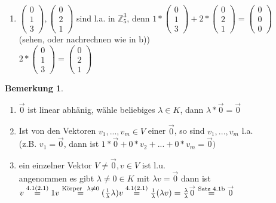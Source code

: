 \documentclass[a4paper,11pt]{article}
\newtheorem{bem}[definition]{Bemerkung}
\begin{document}
\begin{enumerate}[label=\alph*)]
\item $\begin{pmatrix}0\\1\\3\end{pmatrix},\begin{pmatrix}0\\2\\1\end{pmatrix}$ sind l.a. in $\mathbb{Z}^3_5$, denn $1*\begin{pmatrix}0\\1\\3\end{pmatrix}+2*\begin{pmatrix}0\\2\\1\end{pmatrix}=\begin{pmatrix}0\\0\\0\end{pmatrix}$ \\
(sehen, oder nachrechnen wie in b)) \\
$2*\begin{pmatrix}0\\1\\3\end{pmatrix}=\begin{pmatrix}0\\2\\1\end{pmatrix}$
\end{enumerate}
\begin{bem}
\end{bem}
\begin{enumerate}[label=\alph*)]
\item $\overset{\rightarrow}{0}$ ist linear abhänig, wähle beliebiges $\lambda\in K$, dann $\lambda*\overset{\rightarrow}{0}=\overset{\rightarrow}{0}$
\item Ist von den Vektoren $v_1,...,v_m\in V$ einer $\overset{\rightarrow}{0}$, so sind $v_1,...,v_m$ l.a. \\
(z.B. $v_1=\overset{\rightarrow}{0}$, dann ist $1*\overset{\rightarrow}{0}+0*v_2+...+0*v_m=\overset{\rightarrow}{0})$
\item ein einzelner Vektor $V\neq\overset{\rightarrow}{0},v\in V$ ist l.u. \\
angenommen es gibt $\lambda\neq0\in K$ mit $\lambda v=\overset{\rightarrow}{0}$ dann ist \\
$v\overset{4.1(2.1)}{=}1v\overset{\text{Körper}\hspace{2mm}\lambda\neq0}{=}(\frac{1}{\lambda}\lambda)v\overset{4.1(2.1)}{=}\frac{1}{\lambda}(\lambda v)=\frac{\lambda}{\lambda}\overset{\rightarrow}{0}\overset{\text{Satz 4.1b}}{=}\overset{\rightarrow}{0}$
\end{enumerate}
\end{document}
